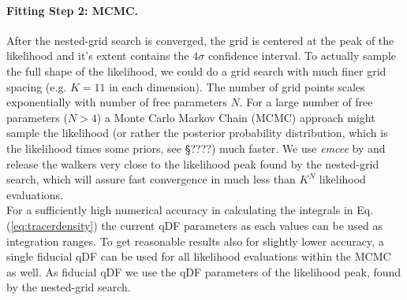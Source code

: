 \paragraph{Fitting Step 2: MCMC.} After the nested-grid search is converged, the grid is centered at the peak of the likelihood and it's extent contains the $4\sigma$ confidence interval. To actually sample the full shape of the likelihood, we could do a grid search with much finer grid spacing (e.g. $K=11$ in each dimension). The number of grid points scales exponentially with number of free parameters $N$. For a large number of free parameters ($N>4$) a Monte Carlo Markov Chain (MCMC) approach might sample the likelihood (or rather the posterior probability distribution, which is the likelihood times some priors, see \S ????) much faster. We use \emph{emcee} by \citet{for13} and release the walkers very close to the likelihood peak found by the nested-grid search, which will assure fast convergence in much less than $K^N$ likelihood evaluations.
\\For a sufficiently high numerical accuracy in calculating the integrals in Eq. (\ref{eq:tracerdensity}) the current qDF parameters as each values can be used as integration ranges. To get reasonable results also for slightly lower accuracy, a single fiducial qDF can be used for all likelihood evaluations within the MCMC as well. As fiducial qDF we use the qDF parameters of the likelihood peak, found by the nested-grid search.
